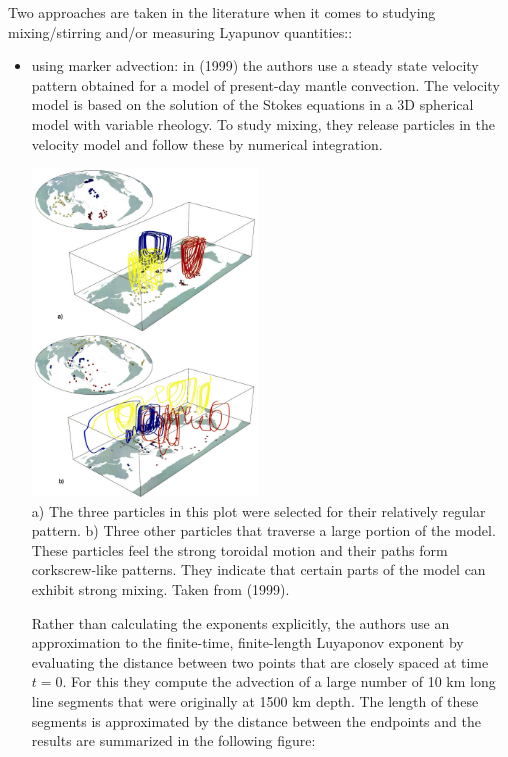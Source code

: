 Two approaches are taken in the literature when it comes to studying mixing/stirring and/or measuring Lyapunov quantities::

\begin{itemize}
\item using marker advection: in \textcite{vazh99} (1999) the authors use a steady state velocity
pattern obtained for a model of present-day mantle convection. The velocity model is
based on the solution of the Stokes equations in a 3D spherical model with variable rheology.
To study mixing, they release particles in the velocity model and follow 
these by numerical integration. 

\begin{center}
\includegraphics[width=6cm]{images/mixing/vazh99}\\
{\captionfont a) The three particles in this plot were
selected for their relatively regular pattern. 
b) Three other particles that traverse a large portion of the model. These particles feel 
the strong toroidal motion and their paths form corkscrew-like patterns. 
They indicate that certain parts of the model can exhibit strong mixing. 
Taken from \textcite{vazh99} (1999).}
\end{center}

Rather than calculating the exponents explicitly, the authors 
use an approximation to the finite-time,
finite-length Luyaponov exponent by evaluating the distance between two points that are closely spaced
at time $t=0$. For this they compute the advection of a
large number of 10 km long line segments that were
originally at 1500 km depth. The length of these segments is approximated by the distance between the
endpoints and the results are summarized in the following figure:


\end{itemize}
